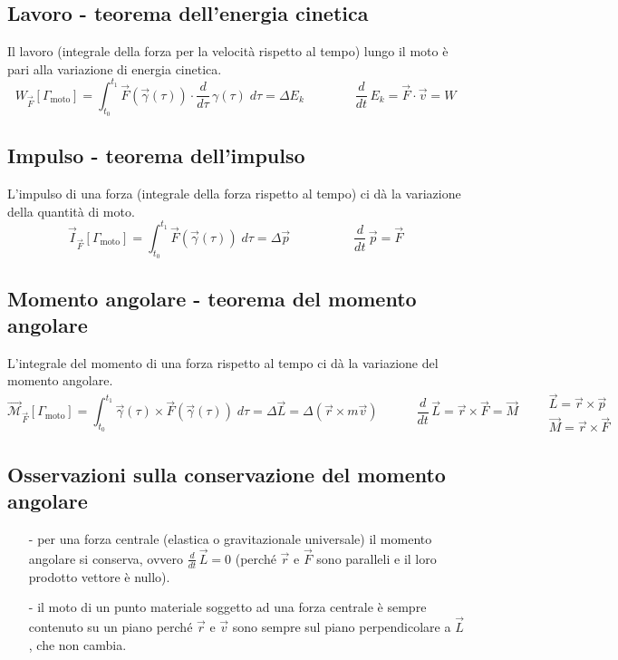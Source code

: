 \documentclass[a4paper]{article}
\newcommand\dt{\frac{d}{dt}\,}
\newcommand\dtau{\frac{d}{d\tau}\,}
\begin{document}
\subsection{Lavoro - teorema dell'energia cinetica}
Il lavoro (integrale della forza per la velocità rispetto al tempo) lungo il moto è pari alla variazione di energia cinetica.
\[W_{\vec{F}}[\Gamma_\text{moto}] = \int_{t_0}^{t_1} \vec{F}(\vec{\gamma}(\tau)) \cdot \dtau \gamma(\tau) \; d\tau = \Delta E_k \qquad \qquad \dt E_k = \vec{F} \cdot \vec{v} = W\]

\subsection{Impulso - teorema dell'impulso}
L'impulso di una forza (integrale della forza rispetto al tempo) ci dà la variazione della quantità di moto.
\[\vec{I}_{\vec{F}}[\Gamma_\text{moto}] = \int_{t_0}^{t_1} \vec{F}(\vec{\gamma}(\tau)) \; d\tau = \Delta \vec{p} \qquad \qquad \quad \dt \vec{p} = \vec{F}\]

\subsection{Momento angolare - teorema del momento angolare}
L'integrale del momento di una forza rispetto al tempo ci dà la variazione del momento angolare.
\[\vec{\mathcal{M}}_{\vec{F}}[\Gamma_\text{moto}] = \int_{t_0}^{t_1} \vec{\gamma}(\tau) \times \vec{F}(\vec{\gamma}(\tau)) \; d\tau = \Delta \vec{L} = \Delta (\vec{r} \times m \vec{v}) \qquad \quad \dt \vec{L} = \vec{r} \times \vec{F} = \vec{M} \qquad \begin{array}{c} \vec{L} = \vec{r} \times \vec{p} \\ \vec{M} = \vec{r} \times \vec{F} \end{array}\]

\subsection{Osservazioni sulla conservazione del momento angolare}
\begin{itemize}
	\item[-] per una forza centrale (elastica o gravitazionale universale) il momento angolare si conserva, ovvero \(\dt \vec{L} = 0\) (perché
	\(\vec{r}\) e \(\vec{F}\) sono paralleli e il loro prodotto vettore è nullo).
	\item[-] il moto di un punto materiale soggetto ad una forza centrale è sempre contenuto su un piano perché \(\vec{r}\) e \(\vec{v}\) sono
	sempre sul piano perpendicolare a \(\vec{L}\), che non cambia.
\end{itemize}
\end{document}
